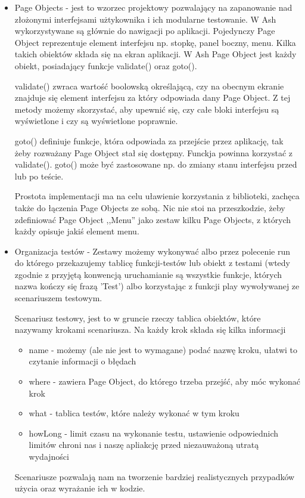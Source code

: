 \documentclass[brudnopis]{xmgr}
\begin{document}
\begin{itemize}
  \item Page Objects - jest to wzorzec projektowy pozwalający na zapanowanie nad złożonymi interfejsami użtykownika i ich modularne testowanie. W Ash wykorzystywane są głównie do nawigacji po aplikacji. Pojedynczy Page Object reprezentuje element interfejsu np. stopkę, panel boczny, menu. Kilka takich obiektów składa się na ekran aplikacji. W Ash Page Object jest każdy obiekt, posiadający funkcje validate() oraz goto().

validate() zwraca wartość boolowską określającą, czy na obecnym ekranie znajduje się element interfejsu za który odpowiada dany Page Object. Z tej metody możemy skorzystać, aby upewnić się, czy całe bloki interfejsu są wyświetlone i czy są wyświetlone poprawnie.

goto() definiuje funkcje, która odpowiada za przejście przez aplikację, tak żeby rozważany Page Object stał się dostępny. Funckja powinna korzystać z validate(). goto() może być zastosowane np. do zmiany stanu interfejsu przed lub po teście.

Prostota implementacji ma na celu uławienie korzystania z biblioteki, zachęca także do łączenia Page Objects ze sobą. Nic nie stoi na przeszkodzie, żeby zdefiniować Page Object ,,Menu'' jako zestaw kilku Page Objects, z których każdy opisuje jakiś element menu. 

 \item Organizacja testów - Zestawy możemy wykonywać albo przez polecenie run do którego przekazujemy tablicę funkcji-testów lub obiekt z testami (wtedy zgodnie z przyjętą konwencją uruchamianie są wszystkie funkcje, których nazwa kończy się frazą 'Test') albo korzystając z funkcji play wywoływanej ze scenariuszem testowym.

Scenariusz testowy, jest to w gruncie rzeczy tablica obiektów, które nazywamy krokami scenariusza. Na każdy krok składa się kilka informacji 

  \begin{itemize}
    \item name - możemy (ale nie jest to wymagane) podać nazwę kroku, ułatwi to czytanie informacji o błędach
    \item where - zawiera Page Object, do którego trzeba przejść, aby móc wykonać krok 
    \item what - tablica testów, które należy wykonać w tym kroku
    \item howLong - limit czasu na wykonanie testu, ustawienie odpowiednich limitów chroni nas i naszę apliakcję przed niezauważoną utratą wydajności
  \end{itemize}

Scenariusze pozwalają nam na tworzenie bardziej realistycznych przypadków użycia oraz wyrażanie ich w kodzie. 

\end{itemize}
\end{document}
